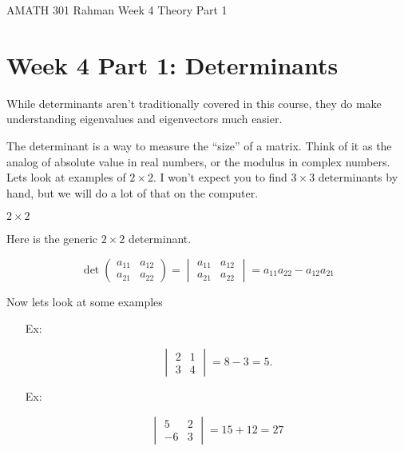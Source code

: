 \documentclass[reqno]{amsart}
\theoremstyle{definition}
\begin{document}
\begin{flushleft}
{\sc \Large AMATH 301 Rahman} \hfill Week 4 Theory Part 1
\bigskip
\end{flushleft}

\newcommand{\R}{\mathbb{R}}
\newcommand{\N}{\mathbb{N}}
\newcommand{\Z}{\mathbb{Z}}
\newcommand{\Q}{\mathbb{Q}}
\renewcommand{\CancelColor}{\color{red}}
\newcommand{\?}{\stackrel{?}{=}}
\renewcommand{\varphi}{\phi}
\newcommand{\card}{\text{Card}}
\newcommand{\bigzero}{\text{\Huge 0}}
\newcommand{\curvearrowdown}{{\color{red}\rotatebox{90}{$\curvearrowleft$}}}
\newcommand{\curvearrowup}{{\color{red}\rotatebox{90}{$\curvearrowright$}}}



\section*{Week 4 Part 1:  Determinants}

While determinants aren't traditionally covered in this course, they do make understanding eigenvalues and eigenvectors much easier.

The determinant is a way to measure the ``size'' of a matrix.  Think of it as the analog of absolute value in real
numbers, or the modulus in complex numbers.  Lets look at examples of $2 \times 2$.  I won't expect you to find $3 \times 3$
determinants by hand, but we will do a lot of that on the computer.

\underline{$2 \times 2$}

Here is the generic $2 \times 2$ determinant.

\begin{equation}
\det \begin{pmatrix}
a_{11} & a_{12}\\
a_{21} & a_{22}
\end{pmatrix} = \begin{vmatrix}
a_{11} & a_{12}\\
a_{21} & a_{22}
\end{vmatrix} = a_{11}a_{22} - a_{12}a_{21}
\end{equation}

Now lets look at some examples

\begin{enumerate}

\item[Ex:  ] 

\begin{equation*}
\begin{vmatrix}
2 & 1\\
3 & 4
\end{vmatrix} = 8 - 3 = 5.
\end{equation*}

\item[Ex:  ]

\begin{equation*}
\begin{vmatrix}
5 & 2\\
-6 & 3
\end{vmatrix} = 15 + 12 = 27
\end{equation*}

\end{enumerate}
\end{document}
